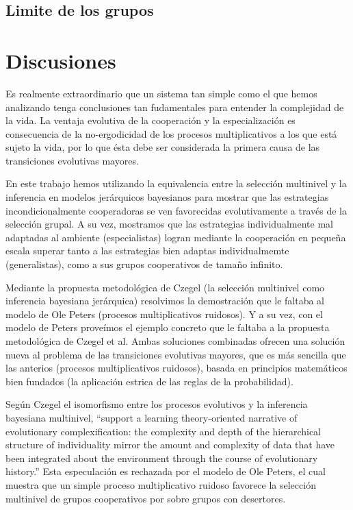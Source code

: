 \documentclass[a4paper,10pt]{article}
\begin{document}
\subsection{Limite de los grupos}


\section{Discusiones}

Es realmente extraordinario que un sistema tan simple como el que hemos analizando tenga conclusiones tan fudamentales para entender la complejidad de la vida.
La ventaja evolutiva de la cooperación y la especialización es consecuencia de la no-ergodicidad de los procesos multiplicativos a los que está sujeto la vida, por lo que ésta debe ser considerada la primera causa de las transiciones evolutivas mayores.

En este trabajo hemos utilizando la equivalencia entre la selección multinivel y la inferencia en modelos jerárquicos bayesianos para mostrar que las estrategias incondicionalmente cooperadoras se ven favorecidas evolutivamente a través de la selección grupal.
A su vez, mostramos que las estrategias individualmente mal adaptadas al ambiente (especialistas) logran mediante la cooperación en pequeña escala superar tanto a las estrategias bien adaptas individualmemte (generalistas), como a sus grupos cooperativos de tamaño infinito.

Mediante la propuesta metodológica de Czegel \cite{czegel2019-bayesianEvolution} (la selección multinivel como inferencia bayesiana jerárquica) resolvimos la demostración que le faltaba al modelo de Ole Peters (procesos multiplicativos ruidosos).
Y a su vez, con el modelo de Peters proveímos el ejemplo concreto que le faltaba a la propuesta metodológica de Czegel et al.
Ambas soluciones combinadas ofrecen una solución nueva al problema de las transiciones evolutivas mayores, que es más sencilla que las anterios (procesos multiplicativos ruidosos), basada en principios matemáticos bien fundados (la aplicación estrica de las reglas de la probabilidad).

Según Czegel \cite{czegel2019-bayesianEvolution} el isomorfismo entre los procesos evolutivos y la inferencia bayesiana multinivel,  ``support a learning theory-oriented narrative of evolutionary complexification: the complexity and depth of the hierarchical structure of individuality mirror the amount and complexity of data that have been integrated about the environment through the course of evolutionary history.''
Esta especulación es rechazada por el modelo de Ole Peters, el cual muestra que un simple proceso multiplicativo ruidoso favorece la selección multinivel de grupos cooperativos por sobre grupos con desertores.
\end{document}
